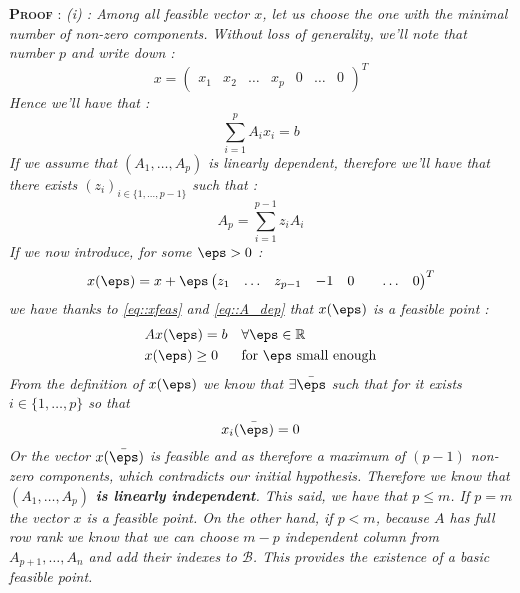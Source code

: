 \documentclass[a4paper]{article}
\begin{document}
{{{				\begin{leftbar}
					\noindent\textbf{\textsc{Proof}} :\newline
					\emph{(i) : Among all feasible vector $x$, let us choose the one with the minimal number of non-zero components. Without loss of generality, we'll note that number $p$ and write down : 
					\begin{equation}
						x = \begin{pmatrix} x_1 & x_2 & \hdots & x_p & 0 & \hdots & 0 \end{pmatrix}^T
					\end{equation}
					Hence we'll have that : 
					\begin{equation}
						\sum_{i=1}^p A_i x_i = b
						\label{eq::xfeas}
					\end{equation}
					If we assume that $(A_1,\hdots, A_p)$ is linearly dependent, therefore we'll have that there exists $(z_i)_{i\in\{1,\hdots,p-1\}}$ such that : 
					\begin{equation}
						A_p = \sum_{i=1}^{p-1}z_i A_i 
						\label{eq::A_dep}
					\end{equation}
					If we now introduce, for some $\eps>0$ :  
					\begin{equation}
							x(\eps) = x + \eps \begin{pmatrix} z_1 & \hdots & z_{p-1} & -1 & 0 & &\hdots & 0\end{pmatrix} ^T
					\end{equation}
					we have thanks to \eqref{eq::xfeas} and \eqref{eq::A_dep} that $x(\eps)$ is a feasible point :
					$$
						\begin{aligned}
							&Ax(\eps) = b &&\forall{\eps}\in\mathbb{R} \\
							&x(\eps)\geq 0 && \text{for } \eps \text{ small enough}
						\end{aligned}
					$$
					From the definition of $x(\eps)$ we know that $\exists \bar{\eps}$ such that for it exists $i\in\{1,\hdots,p\}$ so that 
					$$
						x_i(\bar{\eps}) = 0
					$$
					Or the vector $x(\bar{\eps})$ is feasible and as therefore a maximum of $(p-1)$ non-zero components, which contradicts our initial hypothesis. Therefore we know that \textbf{$(A_1,\hdots, A_p)$ is linearly independent}. \newline
					This said, we have that $p\leq m$. If $p=m$ the vector $x$ is a feasible point. On the other hand, if $p<m$, because $A$ has full row rank we know that we can choose $m-p$ independent column from $A_{p+1}, \hdots, A_n$ and add their indexes to $\mathcal{B}$. This provides the existence of a basic feasible point. 
					}
				\end{leftbar}
			}
}}
\end{document}
